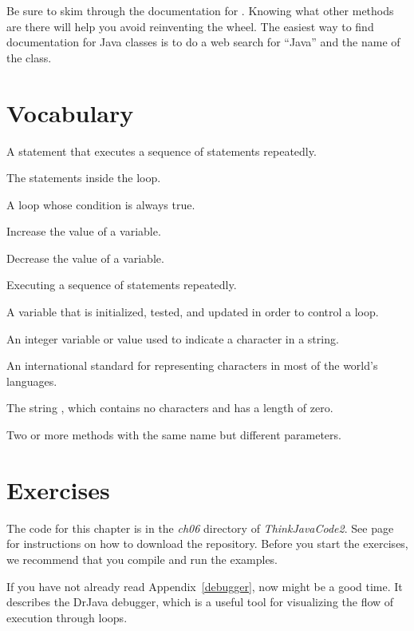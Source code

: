 Be sure to skim through the documentation for .
Knowing what other methods are there will help you avoid reinventing the wheel.
The easiest way to find documentation for Java classes is to do a web search for ``Java'' and the name of the class.


\section{Vocabulary}
\label{loops-strings_vocabulary}

\begin{description}

A statement that executes a sequence of statements repeatedly.

The statements inside the loop.

A loop whose condition is always true.

Increase the value of a variable.

Decrease the value of a variable.

Executing a sequence of statements repeatedly.

A variable that is initialized, tested, and updated in order to control a loop.

An integer variable or value used to indicate a character in a string.

An international standard for representing characters in most of the world's languages.

The string , which contains no characters and has a length of zero.

Two or more methods with the same name but different parameters.

\end{description}


\section{Exercises}
\label{loops-strings_exercises}

The code for this chapter is in the {\it ch06} directory of {\it ThinkJavaCode2}.
See page~\pageref{code} for instructions on how to download the repository.
Before you start the exercises, we recommend that you compile and run the examples.

If you have not already read Appendix~\ref{debugger}, now might be a good time.
It describes the DrJava debugger, which is a useful tool for visualizing the flow of execution through loops.


